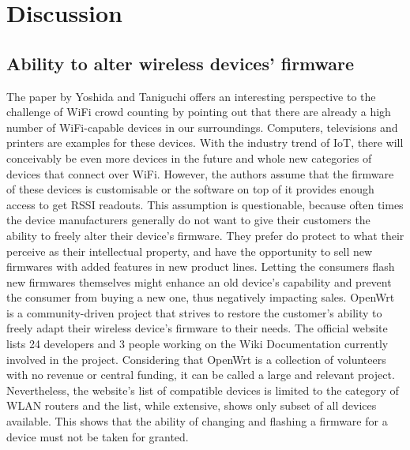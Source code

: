\documentclass[conference]{IEEEtran}
\begin{document}
\section{Discussion}
\subsection{Ability to alter wireless devices' firmware}
The paper by Yoshida and Taniguchi \cite{Yoshida} offers an interesting perspective to the challenge of WiFi crowd counting by pointing out that there are already a high number of WiFi-capable devices in our surroundings. Computers, televisions and printers are examples for these devices. With the industry trend of IoT, there will conceivably be even more devices in the future and whole new categories of devices that connect over WiFi. However, the authors assume that the firmware of these devices is customisable or the software on top of it provides enough access to get RSSI readouts. This assumption is questionable, because often times the device manufacturers generally do not want to give their customers the ability to freely alter their device's firmware. They prefer do protect to what their perceive as their intellectual property, and have the opportunity to sell new firmwares with added features in new product lines. Letting the consumers flash new firmwares themselves might enhance an old device's capability and prevent the consumer from buying a new one, thus negatively impacting sales. OpenWrt \cite{OpenWrt} is a community-driven project that strives to restore the customer's ability to freely adapt their wireless device's firmware to their needs. The official website lists 24 developers and 3 people working on the Wiki Documentation currently involved in the project. Considering that OpenWrt is a collection of volunteers with no revenue or central funding, it can be called a large and relevant project. Nevertheless, the website's list of compatible devices is limited to the category of WLAN routers and the list, while extensive, shows only subset of all devices available. This shows that the ability of changing and flashing a firmware for a device must not be taken for granted.
\end{document}
